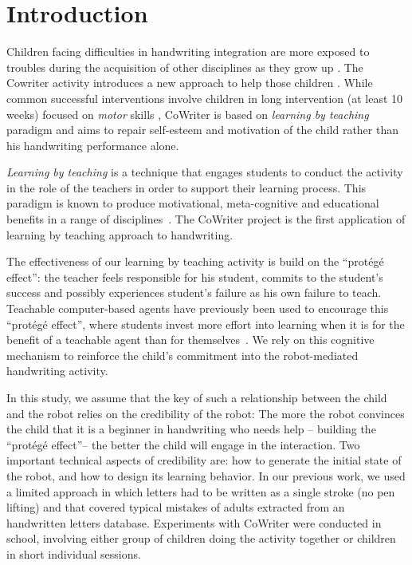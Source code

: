 \documentclass{sig-alternate}
\begin{document}

\section{Introduction}

Children facing difficulties in handwriting integration are more exposed
to troubles during the acquisition of other disciplines as they grow up
\cite{Christensen2005}. 
The Cowriter activity introduces a new approach to help those children
\cite{Hood}. While common successful interventions involve children
in long intervention (at least 10 weeks) focused on \emph{motor} skills \cite{Hoy2011},
CoWriter is based on \emph{learning by teaching} paradigm and aims to repair
self-esteem and motivation of the child rather than his handwriting performance alone.

\emph{Learning by teaching} is a technique that engages students to conduct the activity in the role of the teachers in order to support their learning process. This 
paradigm is known to produce motivational, meta-cognitive and educational
benefits in a range of disciplines~\cite{Rohrbeck2003}. The CoWriter project
is the first application of learning by teaching approach to handwriting. 

The effectiveness of our learning by teaching activity is build on the
``prot\'eg\'e effect'': the teacher feels responsible for his student, commits
to the student's success and possibly experiences student's failure as his own
failure to teach. Teachable computer-based agents have previously been used to
encourage this ``prot\'eg\'e effect'', where students invest more effort into
learning when it is for the benefit of a teachable agent than for themselves~\cite{Chase2009}.
We rely on this cognitive mechanism to reinforce the child's commitment into the
robot-mediated handwriting activity.

In this study, we assume that the key of such a relationship between the child
and the robot relies on the credibility of the robot:
The more the robot convinces the child that it is a beginner in
handwriting who needs help -- building the ``prot\'eg\'e effect''-- the better
the child will engage in the interaction. Two important technical aspects of
credibility are: how to generate the initial state of the robot, and how to design its
learning behavior. In our previous work, we used a limited approach in which
letters had to be written as a single stroke (no pen lifting) and that covered
typical mistakes of adults extracted from an handwritten letters database. Experiments with CoWriter were conducted in school, involving either group of
children doing the activity together or children
in short individual sessions.
\end{document}
